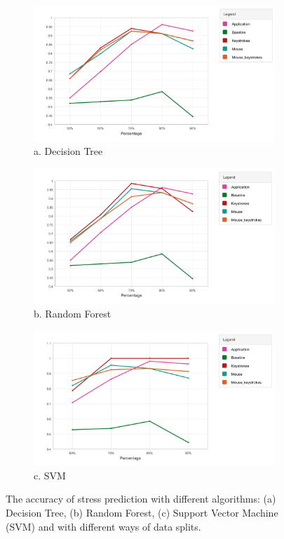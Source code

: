 \documentclass{article}
\begin{document}
\begin{figure}
	\centering
	\begin{subfigure}
		\centering
		\includegraphics[width=\columnwidth]{DecisionTree.png} {a. Decision Tree}
	\end{subfigure}
	\begin{subfigure}
		\centering
		\includegraphics[width=\columnwidth]{RandomForest.png} {b. Random Forest}
	\end{subfigure}
	\begin{subfigure}
		\centering
		\includegraphics[width=\columnwidth]{SVM.png} {c. SVM}
	\end{subfigure}
	\caption{The accuracy of stress prediction with different algorithms: (a) Decision Tree, (b) Random Forest, (c) Support Vector Machine (SVM) and with different ways of data splits.} \label{prediction}
\end{figure}
\end{document}
